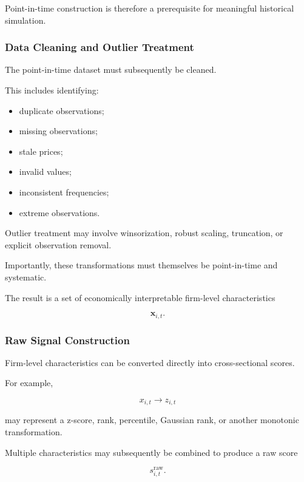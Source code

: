 \documentclass[11pt,a4paper]{article}
\begin{document}
Point-in-time construction is therefore a prerequisite for meaningful
historical simulation.


\subsubsection{Data Cleaning and Outlier Treatment}

The point-in-time dataset must subsequently be cleaned.

This includes identifying:

\begin{itemize}
    \item duplicate observations;
    \item missing observations;
    \item stale prices;
    \item invalid values;
    \item inconsistent frequencies;
    \item extreme observations.
\end{itemize}

Outlier treatment may involve winsorization, robust scaling, truncation, or
explicit observation removal.

Importantly, these transformations must themselves be point-in-time and
systematic.

The result is a set of economically interpretable firm-level characteristics

\begin{equation}
\mathbf{x}_{i,t}.
\end{equation}


\subsubsection{Raw Signal Construction}

Firm-level characteristics can be converted directly into cross-sectional
scores.

For example,

\begin{equation}
x_{i,t}
\rightarrow
z_{i,t}
\end{equation}

may represent a z-score, rank, percentile, Gaussian rank, or another monotonic
transformation.

Multiple characteristics may subsequently be combined to produce a raw score

\begin{equation}
\boxed{
s_{i,t}^{\mathrm{raw}}.
}
\end{equation}
\end{document}
